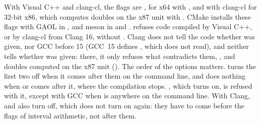 \noindent
With Visual C++ and clang-cl, the flags are ,
 for x64 with , and  with
clang-cl for 32-bit x86, which computes doubles on the x87 unit with
. CMake installs these flags with GAOL in ,
and meson in  and .  refuses code
compiled by Visual C++, or by clang-cl from Clang 16, without
. Clang does not tell the code whether
 was given, nor GCC before 15 (GCC~15 defines
, which  does not read),
and neither tells whether  was given: there, it
only refuses what contradicts them, ,
 and doubles computed on the x87 unit
(). The order of the options matters.
 turns the first two off when it comes after them on
the command line, and does nothing when  or
 comes after it, where the compilation stops.
, which turns  on, is refused with it,
except with GCC when  is anywhere on the command line.
With Clang,  and  also turn
 off, which  does not turn on
again: they have to come before the flags of interval arithmetic, not after
them.


